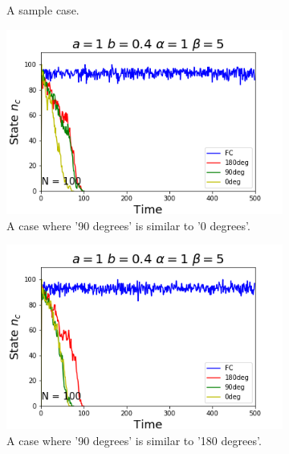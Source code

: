 \begin{figure}[h]
\begin{subfigure}[b]{0.3\linewidth}
    \caption{A sample case.}
  \end{subfigure}
    \begin{subfigure}[b]{0.3\linewidth}
    \includegraphics[width=\linewidth]{images/chapter4/feedback_sim3.png}
    \caption{A case where '90 degrees' is similar to '0 degrees'.}
  \end{subfigure}
    \begin{subfigure}[b]{0.3\linewidth}
    \includegraphics[width=\linewidth]{images/chapter4/feedback_sim2.png}
    \caption{A case where '90 degrees' is similar to '180 degrees'.}
  \end{subfigure}
  \begin{subfigure}[b]{0.3\linewidth}

\end{subfigure}
\end{figure}
